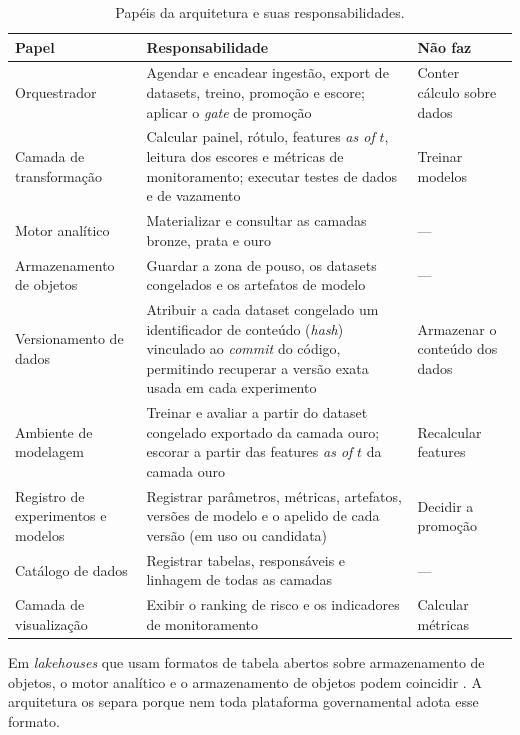 \begin{table}[htbp]
	\centering
	\caption{Papéis da arquitetura e suas responsabilidades.}
	\label{tab:responsabilidades}
	\small
	\begin{tabularx}{\textwidth}{@{}>{\raggedright\arraybackslash}p{3.1cm}>{\raggedright\arraybackslash}X>{\raggedright\arraybackslash}p{3.0cm}@{}}
		\toprule
		\textbf{Papel} & \textbf{Responsabilidade} & \textbf{Não faz} \\
		\midrule
		Orquestrador & Agendar e encadear ingestão, export de datasets, treino, promoção e escore; aplicar o \textit{gate} de promoção & Conter cálculo sobre dados \\ \addlinespace
		Camada de transformação & Calcular painel, rótulo, features \textit{as of} $t$, leitura dos escores e métricas de monitoramento; executar testes de dados e de vazamento & Treinar modelos \\ \addlinespace
		Motor analítico & Materializar e consultar as camadas bronze, prata e ouro & --- \\ \addlinespace
		Armazenamento de objetos & Guardar a zona de pouso, os datasets congelados e os artefatos de modelo & --- \\ \addlinespace
		Versionamento de dados & Atribuir a cada dataset congelado um identificador de conteúdo (\textit{hash}) vinculado ao \textit{commit} do código, permitindo recuperar a versão exata usada em cada experimento & Armazenar o conteúdo dos dados \\ \addlinespace
		Ambiente de modelagem & Treinar e avaliar a partir do dataset congelado exportado da camada ouro; escorar a partir das features \textit{as of} $t$ da camada ouro & Recalcular features \\ \addlinespace
		Registro de experimentos e modelos & Registrar parâmetros, métricas, artefatos, versões de modelo e o apelido de cada versão (em uso ou candidata) & Decidir a promoção \\ \addlinespace
		Catálogo de dados & Registrar tabelas, responsáveis e linhagem de todas as camadas & --- \\ \addlinespace
		Camada de visualização & Exibir o ranking de risco e os indicadores de monitoramento & Calcular métricas \\
		\bottomrule
	\end{tabularx}
\end{table}

Em \textit{lakehouses} que usam formatos de tabela abertos sobre armazenamento de objetos, o motor analítico e o armazenamento de objetos podem coincidir \cite{armbrust2021}. A arquitetura os separa porque nem toda plataforma governamental adota esse formato.

